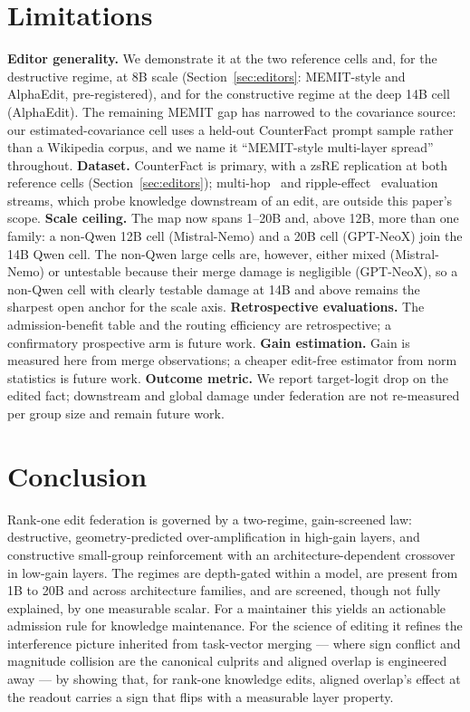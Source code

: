 \documentclass[preprint,12pt]{elsarticle}
\begin{document}
\section{Limitations}\label{sec:limits}
\textbf{Editor generality.} We demonstrate it at the two reference cells and, for the
destructive regime, at 8B scale (Section~\ref{sec:editors}: MEMIT-style and AlphaEdit,
pre-registered), and for the constructive regime at the deep 14B cell (AlphaEdit). The
remaining MEMIT gap has narrowed to the covariance source: our estimated-covariance
cell uses a held-out CounterFact prompt sample rather than a Wikipedia corpus, and we
name it ``MEMIT-style multi-layer spread'' throughout.
\textbf{Dataset.} CounterFact is primary, with a zsRE replication at both reference cells
(Section~\ref{sec:editors}); multi-hop~\cite{mquake2023} and ripple-effect~\cite{rippleedits2024}
evaluation streams, which probe knowledge downstream of an edit, are outside this paper's
scope.
\textbf{Scale ceiling.} The map now spans 1--20B and, above 12B, more than one family: a
non-Qwen 12B cell (Mistral-Nemo) and a 20B cell (GPT-NeoX) join the 14B Qwen cell. The
non-Qwen large cells are, however, either mixed (Mistral-Nemo) or untestable because their
merge damage is negligible (GPT-NeoX), so a non-Qwen cell with clearly testable damage at
14B and above remains the sharpest open anchor for the scale axis.
\textbf{Retrospective evaluations.} The admission-benefit table and the routing efficiency
are retrospective; a confirmatory prospective arm is future work.
\textbf{Gain estimation.} Gain is measured here from merge observations; a cheaper edit-free
estimator from norm statistics is future work.
\textbf{Outcome metric.} We report target-logit drop on the edited fact; downstream and
global damage under federation are not re-measured per group size and remain future
work.

\section{Conclusion}\label{sec:conclusion}
Rank-one edit federation is governed by a two-regime, gain-screened law: destructive,
geometry-predicted over-amplification in high-gain layers, and constructive small-group
reinforcement with an architecture-dependent crossover in low-gain layers. The regimes are
depth-gated within a model, are present from 1B to 20B and across \nFamilies{}
architecture families, and are screened, though not fully explained, by one measurable
scalar. For a maintainer this yields an actionable admission rule for knowledge
maintenance. For the science of editing it refines the interference picture
inherited from task-vector merging --- where sign conflict and magnitude collision
are the canonical culprits and aligned overlap is engineered away --- by showing
that, for rank-one knowledge edits, aligned overlap's effect at the readout carries
a sign that flips with a measurable layer property.
\end{document}

